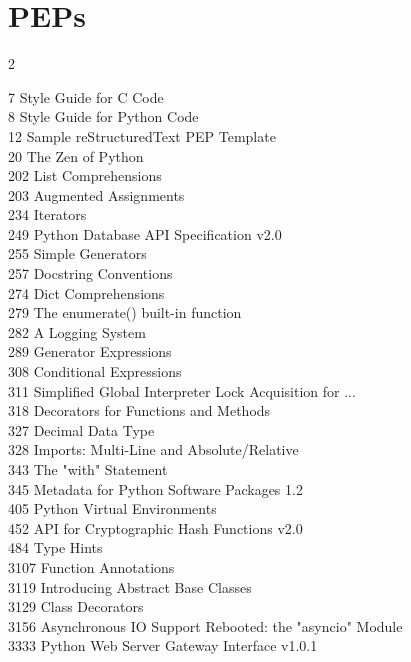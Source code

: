 \documentclass [8pt] {extarticle}
\begin{document}
    \section {PEPs}

    \begin {multicols} {2}

    7  Style Guide for C Code \\
    8  Style Guide for Python Code \\
    12  Sample reStructuredText PEP Template \\
    20  The Zen of Python \\
    202  List Comprehensions \\
    203  Augmented Assignments \\
    234  Iterators \\
    249  Python Database API Specification v2.0 \\
    255  Simple Generators \\
    257  Docstring Conventions \\
    274  Dict Comprehensions \\
    279  The enumerate() built-in function \\
    282  A Logging System \\
    289  Generator Expressions \\
    308  Conditional Expressions \\
    311  Simplified Global Interpreter Lock Acquisition for ... \\
    318  Decorators for Functions and Methods \\
    327  Decimal Data Type \\
    328  Imports: Multi-Line and Absolute/Relative \\
    343  The "with" Statement \\
    345  Metadata for Python Software Packages 1.2 \\
    405  Python Virtual Environments \\
    452  API for Cryptographic Hash Functions v2.0 \\
    484  Type Hints \\
    3107  Function Annotations \\
    3119  Introducing Abstract Base Classes \\
    3129  Class Decorators \\
    3156  Asynchronous IO Support Rebooted: the "asyncio" Module \\
    3333  Python Web Server Gateway Interface v1.0.1 \\

    \end {multicols}
\end{document}
